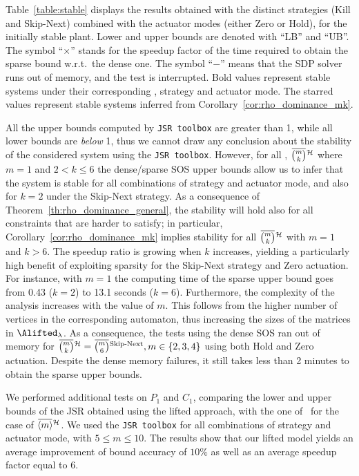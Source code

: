 Table~\ref{table:stable} displays the results obtained with the distinct strategies (Kill and Skip-Next) combined with the actuator modes (either Zero or Hold), for the initially stable plant.
Lower and upper bounds are denoted with ``LB'' and ``UB''.
The symbol ``$\times$'' stands for the speedup factor of the time required to obtain the sparse bound w.r.t.~the dense one.
The symbol ``$-$'' means that the SDP solver runs out of memory, and the test is interrupted.
Bold values represent stable systems under their corresponding \ewhc{}, strategy and actuator mode.
The starred values represent stable systems inferred from Corollary~\ref{cor:rho_dominance_mk}.

All the upper bounds computed by \texttt{JSR toolbox} are greater than 1, while all lower bounds are \emph{below} 1, thus we cannot draw any conclusion about the stability of the considered system using the \texttt{JSR toolbox}.
However, for all \ewhc{}, $\overbar{\binom{m}{k}}^{\strat}$ where $m=1$ and $2<k\leq 6$ the dense/sparse SOS upper bounds allow us to infer that the system is stable for all combinations of strategy and actuator mode, and also for $k=2$ under the Skip-Next strategy.
As a consequence of Theorem~\ref{th:rho_dominance_general}, the stability will hold also for all constraints that are harder to satisfy; in particular, Corollary~\ref{cor:rho_dominance_mk} implies stability for all $\overbar{\binom{m}{k}}^{\strat}$ with $m=1$ and $k>6$.
The speedup ratio is growing when $k$ increases, yielding a particularly high benefit of exploiting sparsity for the Skip-Next strategy and Zero actuation.
For instance, with $m=1$ the computing time of the sparse upper bound goes from 0.43 ($k=2$) to 13.1 seconds ($k=6$).
%
Furthermore, the complexity of the analysis increases with the value of $m$.
This follows from the higher number of vertices in the corresponding automaton, thus increasing the sizes of the matrices in $\Alifted_{\lambda}$. 
%
As a consequence, the tests using the dense SOS ran out of memory for $\overbar{\binom{m}{k}}^{\strat} = \overbar{\binom{m}{6}}^{\text{Skip-Next}}, m \in \left\{ 2, 3, 4 \right\}$ using both Hold and Zero actuation.
Despite the dense memory failures, it still takes less than 2 minutes to obtain the sparse upper bounds.

We performed additional tests on $P_1$ and $C_1$, comparing the lower and upper bounds of the JSR obtained using the lifted approach, with the one of~\cite{Maggio:2020} for the case of $\overbar{\left<m\right>}^{\strat}$.
We used the \texttt{JSR toolbox} for all combinations of strategy and actuator mode, with $5 \leq m \leq 10$.
The results show that our lifted model yields an average improvement of bound accuracy of $10 \%$ as well as an average speedup factor equal to $6$.

